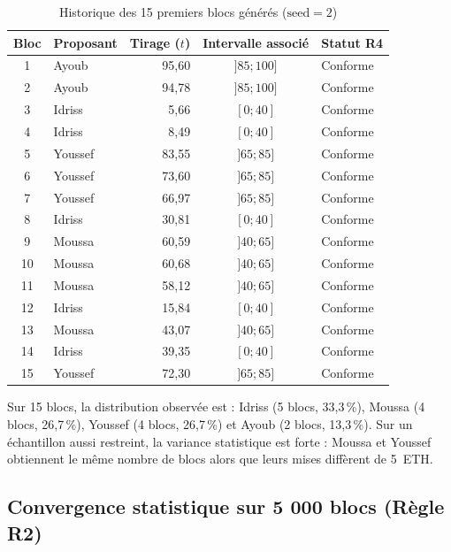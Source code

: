 \documentclass[11pt,a4paper]{article}
\begin{document}
\begin{table}[H]
\centering
\small
\begin{tabular}{@{}clrcl@{}}
\toprule
\textbf{Bloc} & \textbf{Proposant} & \textbf{Tirage ($t$)} & \textbf{Intervalle associé} & \textbf{Statut R4} \\
\midrule
1  & Ayoub   & 95,60 & $]85 ; 100]$ & Conforme \\
2  & Ayoub   & 94,78 & $]85 ; 100]$ & Conforme \\
3  & Idriss  &  5,66 & $[0 ; 40]$   & Conforme \\
4  & Idriss  &  8,49 & $[0 ; 40]$   & Conforme \\
5  & Youssef & 83,55 & $]65 ; 85]$  & Conforme \\
6  & Youssef & 73,60 & $]65 ; 85]$  & Conforme \\
7  & Youssef & 66,97 & $]65 ; 85]$  & Conforme \\
8  & Idriss  & 30,81 & $[0 ; 40]$   & Conforme \\
9  & Moussa  & 60,59 & $]40 ; 65]$  & Conforme \\
10 & Moussa  & 60,68 & $]40 ; 65]$  & Conforme \\
11 & Moussa  & 58,12 & $]40 ; 65]$  & Conforme \\
12 & Idriss  & 15,84 & $[0 ; 40]$   & Conforme \\
13 & Moussa  & 43,07 & $]40 ; 65]$  & Conforme \\
14 & Idriss  & 39,35 & $[0 ; 40]$   & Conforme \\
15 & Youssef & 72,30 & $]65 ; 85]$  & Conforme \\
\bottomrule
\end{tabular}
\caption{Historique des 15 premiers blocs générés ($\text{seed} = 2$)}
\label{tab:15_blocs}
\end{table}

Sur 15 blocs, la distribution observée est : Idriss (5 blocs, 33,3\,\%), Moussa (4 blocs, 26,7\,\%), Youssef (4 blocs, 26,7\,\%) et Ayoub (2 blocs, 13,3\,\%). Sur un échantillon aussi restreint, la variance statistique est forte : Moussa et Youssef obtiennent le même nombre de blocs alors que leurs mises diffèrent de 5~ETH.

\subsection{Convergence statistique sur 5 000 blocs (Règle R2)}
\end{document}
